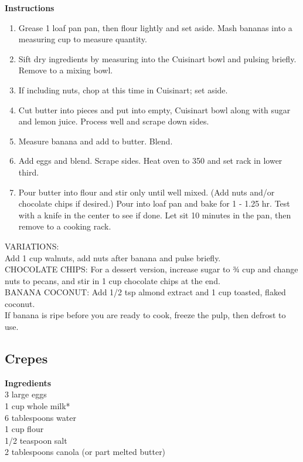 \documentclass{article}
\numberwithin{figure}{section}
\numberwithin{equation}{section}
\begin{document}
{\bf Instructions}
\begin{enumerate}
\item Grease 1 loaf pan pan, then flour lightly and set aside.  Mash bananas into a measuring cup to measure quantity.

\item Sift dry ingredients by measuring into the Cuisinart bowl and pulsing briefly.  Remove to a mixing bowl.

\item If including nuts, chop at this time in Cuisinart; set aside.

\item Cut butter into pieces and put into empty, Cuisinart bowl along with sugar and lemon juice.  Process well and scrape down sides.

\item Measure banana and add to butter. Blend.

\item Add eggs and blend. Scrape sides.  Heat oven to 350 and set rack in lower third.

\item Pour butter into flour and stir only until well mixed. (Add nuts and/or chocolate chips if desired.)  Pour into loaf pan and bake for 1 - 1.25 hr.  Test with a knife in the center to see if done.  Let sit 10 minutes in the pan, then remove to a cooking rack.

\end{enumerate}

VARIATIONS:\\
Add 1 cup walnuts, add nuts after banana and pulse briefly.\\

CHOCOLATE CHIPS:  For a dessert version, increase sugar to ¾ cup and change nuts to pecans, and stir in 1 cup chocolate chips at the end.\\

BANANA COCONUT:  Add 1/2 tsp almond extract and 1 cup toasted, flaked coconut.\\

If banana is ripe before you are ready to cook, freeze the pulp, then defrost to use.

\pagebreak
\subsection{Crepes}
{\bf Ingredients}\\
3 large eggs\\
1 cup whole milk*\\
6 tablespoons water\\
1 cup flour\\
1/2 teaspoon salt\\
2 tablespoons canola (or part melted butter)\\
\end{document}
